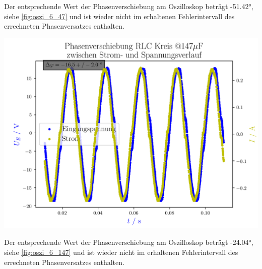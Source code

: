 \documentclass[11pt,ngerman]{scrartcl}
\begin{document}
Der entsprechende Wert der Phasenverschiebung am Oszilloskop beträgt -51.42°, siehe \autoref{fig:oszi_6_47} und ist wieder nicht im erhaltenen Fehlerintervall des errechneten Phasenversatzes enthalten.



\begin{center}
	\begin{minipage}[t]{0.8\textwidth}
		\includegraphics[width=\textwidth]{./figures/phaseleistung/Versuch6/phaseshiftrlc19.png}
		\label{fig:phaseshiftrlc19}
	\end{minipage}
\end{center}

Der entsprechende Wert der Phasenverschiebung am Oszilloskop beträgt -24.04°, siehe \autoref{fig:oszi_6_147} und ist wieder nicht im erhaltenen Fehlerintervall des errechneten Phasenversatzes enthalten.
\end{document}
